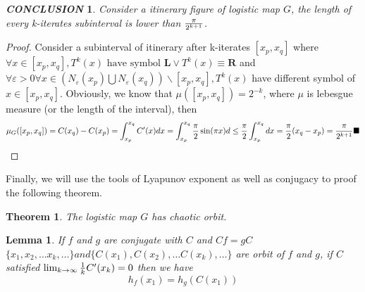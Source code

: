 \documentclass[12pt]{article}
\theoremstyle{plain}
\newtheorem{theorem}{\textbf{Theorem}}[section]
\newtheorem{lemma}{\textbf{Lemma}}[section]
\newtheorem{proof}{\textit{PROOF}}[section]
\newtheorem{conclusion}{\textit{\textbf{CONCLUSION}}}[section]
\begin{document}
\begin{conclusion} Consider a itinerary figure of logistic map $G$, the length of every k-iterates subinterval is lower than $\pi \over 2^{k+1}$.
\end{conclusion}
{\color{blue}
\begin{proof} Consider a subinterval of itinerary after k-iterates $[x_p, x_q]$ where 
\\\noindent $\forall x \in [x_p, x_q], T^k(x) \text{ have symbol } \textbf{L} \lor T^k(x)\equiv\textbf{R}$ and $\forall \varepsilon > 0\forall x \in (N_\varepsilon(x_p) \bigcup  N_\varepsilon(x_q))\backslash[x_p, x_q], T^k(x) $ have different symbol of $x \in [x_p, x_q]$. Obviously, we know that $\mu([x_p, x_q]) = 2^{-k}$, where $\mu$ is lebesgue measure (or the length of the interval), then
$$
\mu_G([x_p, x_q]) = C(x_q) - C(x_p) = \int_{x_p}^{x_q}C'(x) dx = \int_{x_p}^{x_q}{\pi \over 2}\sin(\pi x) d \leq {\pi \over 2}\int_{x_p}^{x_q}dx = {\pi \over 2}(x_q - x_p) = {\pi \over 2^{k+1}} \blacksquare
$$

\end{proof}
}

\newpage
Finally, we will use the tools of Lyapunov exponent as well as conjugacy to proof the following theorem.

\begin{theorem} The logistic map $G$ has chaotic orbit.
\end{theorem}

\begin{lemma} If $f$ and $g$ are conjugate with $C$ and $Cf = gC$ 
\\\noindent $\{x_1, x_2, \ldots x_k, \ldots\} and \{C(x_1), C(x_2), \ldots C(x_k), \ldots\}$ are orbit of $f$ and $g$, if $C$ satisfied $\lim_{k \rightarrow \infty} {1\over k}C'(x_k) = 0$ then we have 
$$
h_f(x_1) = h_g(C(x_1))
$$ 
\end{lemma}
\end{document}
